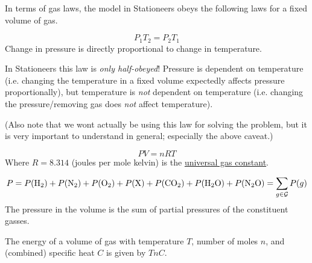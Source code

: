 \documentclass{article}
\newcommand{\Hyd}{\mathrm{H}_2}
\newcommand{\Nit}{\mathrm{N}_2}
\newcommand{\Ox}{\mathrm{O}_2}
\newcommand{\Pol}{\mathrm{X}}
\newcommand{\CDiox}{\mathrm{CO}_2}
\newcommand{\Water}{\mathrm{H}_2\mathrm{O}}
\newcommand{\NiOx}{\mathrm{N}_2\mathrm{O}}
\begin{document}
In terms of gas laws, the model in Stationeers obeys the following laws for a fixed volume of gas.

\begin{definition}
    \begin{equation}
        P_1 T_2=P_2 T_1
        \label{eq:gay-lussac}
    \end{equation}
    Change in pressure is directly proportional to change in temperature.
    \begin{note*}
        In Stationeers this law is \emph{only half-obeyed}!
        Pressure is dependent on temperature (i.e. changing the temperature in a fixed volume
        expectedly affects pressure proportionally), but temperature is \emph{not} dependent on
        temperature (i.e. changing the pressure/removing gas does \emph{not} affect temperature).

        (Also note that we wont actually be using this law for solving the problem, but it is very
        important to understand in general; especially the above caveat.)
    \end{note*}
\end{definition}

\begin{definition}
    \begin{equation}
        PV=nRT
        \label{eq:ideal}
    \end{equation}
    Where $R=8.314$ (joules per mole kelvin)
    is the \href{https://en.wikipedia.org/wiki/Gas_constant}{universal gas constant}.
\end{definition}

\begin{definition}
    \label{def:daltons}
    \begin{equation}
        P
        = P(\Hyd)+P(\Nit)+P(\Ox)+P(\Pol)+P(\CDiox)+P(\Water)+P(\NiOx)
        = \sum_{g\in\calG}P(g)
        \label{eq:partial-p}
    \end{equation}
    The pressure in the volume is the sum of partial pressures of the constituent gasses.
\end{definition}

\begin{definition}
    The energy of a volume of gas with temperature $T$, number of moles $n$, and
    (combined) specific heat $C$ is given by $TnC$.
\end{definition}
\end{document}
